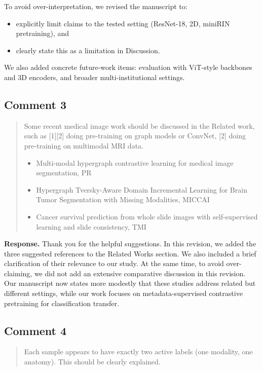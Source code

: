 \documentclass[11pt]{article}
\begin{document}
To avoid over-interpretation, we revised the manuscript to:
\begin{itemize}[leftmargin=1.5em,noitemsep,topsep=0.3em]
\item explicitly limit claims to the tested setting (ResNet-18, 2D, miniRIN pretraining), and
\item clearly state this as a limitation in Discussion.
\end{itemize}
We also added concrete future-work items: evaluation with ViT-style backbones and 3D encoders, and broader multi-institutional settings.

\subsection*{Comment 3}
\begin{quote}
Some recent medical image work should be discussed in the Related work, such as [1][2] doing pre-training on graph models or ConvNet, [2] doing pre-training on multimodal MRI data.
\begin{itemize}[leftmargin=1.5em,noitemsep,topsep=0.3em]
\item [1] Multi-modal hypergraph contrastive learning for medical image segmentation, PR
\item [2] Hypergraph Tversky-Aware Domain Incremental Learning for Brain Tumor Segmentation with Missing Modalities, MICCAI
\item [3] Cancer survival prediction from whole slide images with self-supervised learning and slide consistency, TMI
\end{itemize}
\end{quote}

\textbf{Response.}
Thank you for the helpful suggestions.
In this revision, we added the three suggested references to the Related Works section.
We also included a brief clarification of their relevance to our study.
At the same time, to avoid over-claiming, we did not add an extensive comparative discussion in this revision.
Our manuscript now states more modestly that these studies address related but different settings, while our work focuses on metadata-supervised contrastive pretraining for classification transfer.

\subsection*{Comment 4}
\begin{quote}
Each sample appears to have exactly two active labels (one modality, one anatomy).
This should be clearly explained.
\end{quote}
\end{document}
